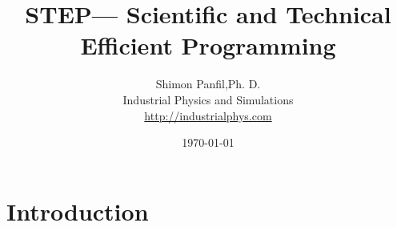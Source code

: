 \documentclass[a4paper]{report}
\title {STEP--- Scientific and Technical Efficient Programming}
\author{Shimon Panfil,Ph. D. \\
    Industrial Physics and Simulations \\
    \href{http://industrialphys.com}{http://industrialphys.com}
}
\date{\today}
\begin{document}
\maketitle
\chapter{Introduction}

\end{document}
